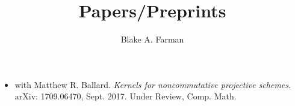 \documentclass[11pt]{amsart}
\title{Papers/Preprints}
\author{Blake A. Farman}
\date{}
\begin{document}
\maketitle

\begin{itemize}
\item
  with Matthew R. Ballard. \textit{Kernels for noncommutative projective schemes}.
  arXiv: 1709.06470, Sept. 2017. Under Review, Comp. Math.
\end{itemize}
\end{document}
